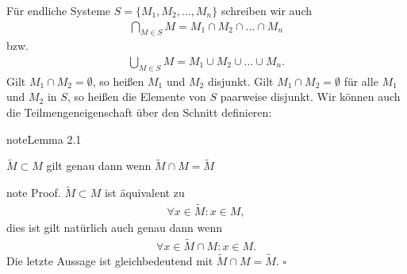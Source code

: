 \documentclass[letterpaper,10pt,english]{jupyterBook}
\begin{document}
Für endliche Systeme \(S=\{M_1,M_2,\ldots,M_n\}\) schreiben wir auch
\begin{equation*}
\begin{split} \bigcap_{M \in S} M  = M_1 \cap M_2 \cap \ldots \cap M_n\end{split}
\end{equation*}
bzw.
\begin{equation*}
\begin{split} \bigcup_{M \in S} M  = M_1 \cup M_2 \cup \ldots \cup M_n.\end{split}
\end{equation*}
Gilt \(M_1 \cap M_2 = \emptyset\), so heißen \(M_1\) und \(M_2\) disjunkt. Gilt \(M_1 \cap M_2 = \emptyset\) für alle \(M_1\) und \(M_2\) in \(S\), so heißen die Elemente von \(S\) paarweise disjunkt.
Wir können auch die Teilmengeneigenschaft über den Schnitt definieren:
\label{grundlagen/mengenlogik:lemma-2}
\begin{sphinxadmonition}{note}{Lemma 2.1}



\(\tilde M \subset M\) gilt genau dann wenn \(\tilde M \cap M = \tilde M\)
\end{sphinxadmonition}

\begin{sphinxadmonition}{note}
Proof. \(\tilde M  \subset M\) ist äquivalent zu
\begin{equation*}
\begin{split} \forall x \in \tilde M: x \in M,
 \end{split}
\end{equation*}
dies ist gilt natürlich auch genau dann wenn
\begin{equation*}
\begin{split} \forall x \in \tilde M \cap M: x \in M.
 \end{split}
\end{equation*}
Die letzte Aussage ist gleichbedeutend mit \(\tilde M \cap M = \tilde M\).
\(\square\)
\end{sphinxadmonition}
\end{document}

